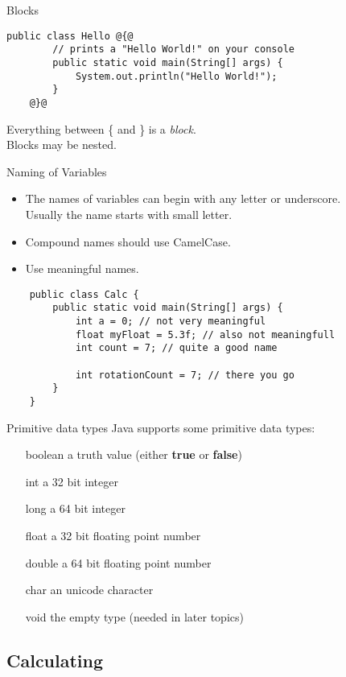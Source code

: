 \begin{frame}[fragile]{Blocks}
	\begin{lstlisting}[style=base]
	public class Hello @{@
	    // prints a "Hello World!" on your console
	    public static void main(String[] args) {
	        System.out.println("Hello World!");
	    }
	@}@
	\end{lstlisting}
	Everything between \{ and \} is a \emph{block}. \\
	Blocks may be nested.
\end{frame}

\begin{frame}[fragile]{Naming of Variables}
	\begin{itemize}
		\item The names of variables can begin with any letter or underscore. \\
		Usually the name starts with small letter.
		\item Compound names should use CamelCase.
		\item Use meaningful names.
	\end{itemize}
	\begin{lstlisting}
	public class Calc {
	    public static void main(String[] args) {
	    	int a = 0; // not very meaningful
	    	float myFloat = 5.3f; // also not meaningfull
	    	int count = 7; // quite a good name

	    	int rotationCount = 7; // there you go
	    }
	}
	\end{lstlisting}
\end{frame}

\begin{frame}{Primitive data types}
	Java supports some primitive data types:
	\begin{itemize}
		\item[boolean] a truth value (either \textbf{true} or \textbf{false})
		\item[int] a 32 bit integer
		\item[long] a 64 bit integer
		\item[float] a 32 bit floating point number
		\item[double] a 64 bit floating point number
		\item[char] an unicode character
		\item[void] the empty type (needed in later topics)
	\end{itemize}
\end{frame}

\subsection{Calculating}

